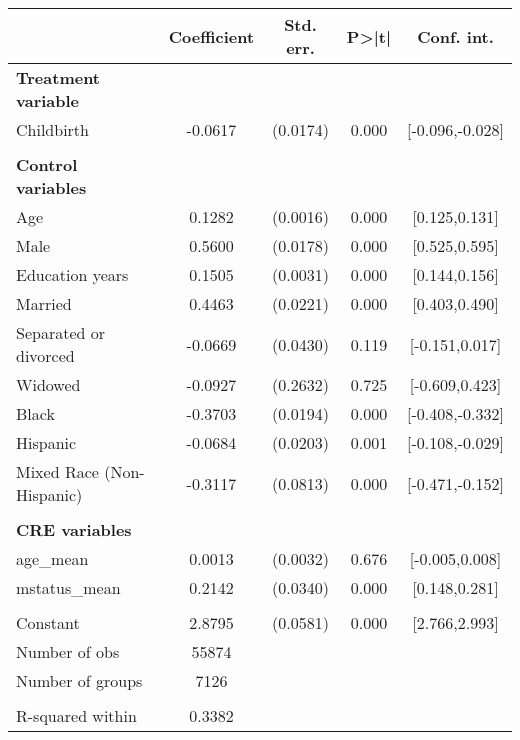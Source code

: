 {
\def\sym#1{\ifmmode^{#1}\else\(^{#1}\)\fi}
\begin{tabular}{l*{1}{cccc}}
\toprule
                    & Coefficient&   Std. err.&       P>|t|&  Conf. int.\\
\midrule
\textbf{Treatment variable}&            &            &            &            \\
Childbirth          &     -0.0617&    (0.0174)&       0.000&[-0.096,-0.028]\\
\\ \textbf{Control variables}&            &            &            &            \\
Age                 &      0.1282&    (0.0016)&       0.000&[0.125,0.131]\\
Male                &      0.5600&    (0.0178)&       0.000&[0.525,0.595]\\
Education years     &      0.1505&    (0.0031)&       0.000&[0.144,0.156]\\
Married             &      0.4463&    (0.0221)&       0.000&[0.403,0.490]\\
Separated or divorced&     -0.0669&    (0.0430)&       0.119&[-0.151,0.017]\\
Widowed             &     -0.0927&    (0.2632)&       0.725&[-0.609,0.423]\\
Black               &     -0.3703&    (0.0194)&       0.000&[-0.408,-0.332]\\
Hispanic            &     -0.0684&    (0.0203)&       0.001&[-0.108,-0.029]\\
Mixed Race (Non-Hispanic)&     -0.3117&    (0.0813)&       0.000&[-0.471,-0.152]\\
\\ \textbf{CRE variables}&            &            &            &            \\
age\_mean            &      0.0013&    (0.0032)&       0.676&[-0.005,0.008]\\
mstatus\_mean        &      0.2142&    (0.0340)&       0.000&[0.148,0.281]\\
                    &            &            &            &            \\
Constant            &      2.8795&    (0.0581)&       0.000&[2.766,2.993]\\
\midrule
Number of obs       &       55874&            &            &            \\
Number of groups    &        7126&            &            &            \\
\\ R-squared within &      0.3382&            &            &            \\

\end{tabular}}
